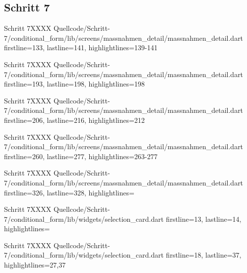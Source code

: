 \ifincludeall \clearpage \fi 


\subsection{Schritt 7}


  \begin{alexlisting}{Schritt 7}{XXXX}
    {Quellcode/Schritt-7/conditional_form/lib/screens/massnahmen_detail/massnahmen_detail.dart}
    {firstline=133, lastline=141, highlightlines={139-141}}
    \label{lst:Schritt7XXXXX}
  \end{alexlisting}

  \begin{alexlisting}{Schritt 7}{XXXX}
    {Quellcode/Schritt-7/conditional_form/lib/screens/massnahmen_detail/massnahmen_detail.dart}
    {firstline=193, lastline=198, highlightlines={198}}
    \label{lst:Schritt7XXXXX}
  \end{alexlisting}

  \begin{alexlisting}{Schritt 7}{XXXX}
    {Quellcode/Schritt-7/conditional_form/lib/screens/massnahmen_detail/massnahmen_detail.dart}
    {firstline=206, lastline=216, highlightlines={212}}
    \label{lst:Schritt7XXXXX}
  \end{alexlisting}

  \begin{alexlisting}{Schritt 7}{XXXX}
    {Quellcode/Schritt-7/conditional_form/lib/screens/massnahmen_detail/massnahmen_detail.dart}
    {firstline=260, lastline=277, highlightlines={263-277}}
    \label{lst:Schritt7XXXXX}
  \end{alexlisting}

  \begin{alexlisting}{Schritt 7}{XXXX}
    {Quellcode/Schritt-7/conditional_form/lib/screens/massnahmen_detail/massnahmen_detail.dart}
    {firstline=326, lastline=328, highlightlines={}}
    \label{lst:Schritt7XXXXX}
  \end{alexlisting}


  \begin{alexlisting}{Schritt 7}{XXXX}
    {Quellcode/Schritt-7/conditional_form/lib/widgets/selection_card.dart}
    {firstline=13, lastline=14, highlightlines={}}
    \label{lst:Schritt7XXXX}
\end{alexlisting}

\begin{alexlisting}{Schritt 7}{XXXX}
    {Quellcode/Schritt-7/conditional_form/lib/widgets/selection_card.dart}
    {firstline=18, lastline=37, highlightlines={27,37}}
    \label{lst:Schritt7XXXX}
\end{alexlisting}

